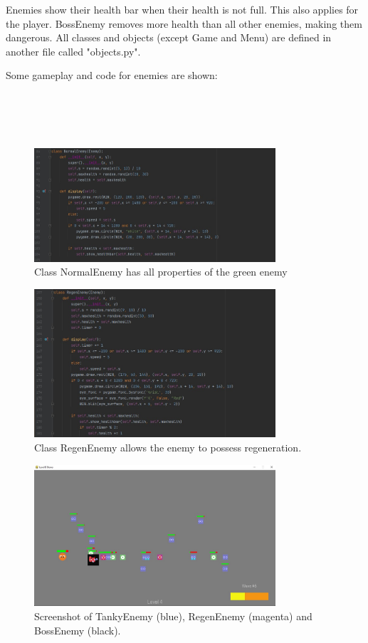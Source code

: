 \documentclass[a4paper, 11pt]{report}
\begin{document}
Enemies show their health bar when their health is not full. This also applies for the player. BossEnemy removes more health than all other enemies, making them dangerous. All classes and objects (except Game and Menu) are defined in another file called "objects.py".

Some gameplay and code for enemies are shown:
\\
\\
\\\\\\
\begin{figure}[h]
    \centering
    \includegraphics[width=0.8\textwidth]{normal_enemy}
    \caption{Class NormalEnemy has all properties of the green enemy}
\end{figure}
\begin{figure}[h]
    \centering
    \includegraphics[width=0.8\textwidth]{regen_enemy}
    \caption{Class RegenEnemy allows the enemy to possess regeneration.}
\end{figure}

\begin{figure}[h]
    \centering
    \includegraphics[width=0.8\textwidth]{level4-5}
    \caption{Screenshot of TankyEnemy (blue), RegenEnemy (magenta) and BossEnemy (black).}
\end{figure}
\end{document}
